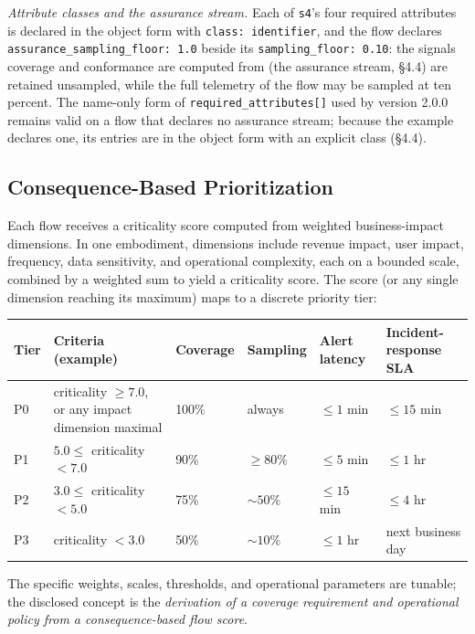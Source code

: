 \documentclass[11pt]{article}
\newcommand{\code}[1]{\texttt{#1}}
\begin{document}
\emph{Attribute classes and the assurance stream.} Each of \code{s4}'s four required attributes is declared in the object form with \code{class: identifier}, and the flow declares \code{assurance\_sampling\_floor: 1.0} beside its \code{sampling\_floor: 0.10}: the signals coverage and conformance are computed from (the assurance stream, \S4.4) are retained unsampled, while the full telemetry of the flow may be sampled at ten percent. The name-only form of \code{required\_attributes[]} used by version 2.0.0 remains valid on a flow that declares no assurance stream; because the example declares one, its entries are in the object form with an explicit class (\S4.4).

\subsection{Consequence-Based Prioritization}
Each flow receives a criticality score computed from weighted business-impact dimensions. In one embodiment, dimensions include revenue impact, user impact, frequency, data sensitivity, and operational complexity, each on a bounded scale, combined by a weighted sum to yield a criticality score. The score (or any single dimension reaching its maximum) maps to a discrete priority tier:

\begin{center}
\footnotesize
\begin{tabular}{@{}l p{3.6cm} l l l p{2.4cm}@{}}
\toprule
\textbf{Tier} & \textbf{Criteria (example)} & \textbf{Coverage} & \textbf{Sampling} & \textbf{Alert latency} & \textbf{Incident-response SLA} \\
\midrule
P0 & criticality \(\geq 7.0\), or any impact dimension maximal & 100\% & always & \(\leq 1\) min & \(\leq 15\) min \\
P1 & \(5.0 \leq\) criticality \(< 7.0\) & 90\% & \(\geq 80\%\) & \(\leq 5\) min & \(\leq 1\) hr \\
P2 & \(3.0 \leq\) criticality \(< 5.0\) & 75\% & \(\sim 50\%\) & \(\leq 15\) min & \(\leq 4\) hr \\
P3 & criticality \(< 3.0\) & 50\% & \(\sim 10\%\) & \(\leq 1\) hr & next business day \\
\bottomrule
\end{tabular}
\end{center}

The specific weights, scales, thresholds, and operational parameters are tunable; the disclosed concept is the \emph{derivation of a coverage requirement and operational policy from a consequence-based flow score}.
\end{document}
